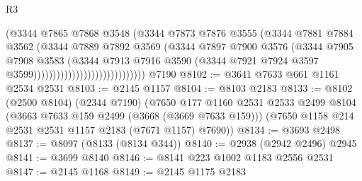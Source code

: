\begin{lexlean}{R3}
\begin{coremodule}
                                              (@3344
                                                @7865
                                                @7868
                                                @3548
                                                (@3344
                                                  @7873
                                                  @7876
                                                  @3555
                                                  (@3344
                                                    @7881
                                                    @7884
                                                    @3562
                                                    (@3344
                                                      @7889
                                                      @7892
                                                      @3569
                                                      (@3344
                                                        @7897
                                                        @7900
                                                        @3576
                                                        (@3344
                                                          @7905
                                                          @7908
                                                          @3583
                                                          (@3344
                                                            @7913
                                                            @7916
                                                            @3590
                                                            (@3344
                                                              @7921
                                                              @7924
                                                              @3597
                                                              @3599)))))))))))))))))))))))))))))
    @7190
@8102 := @3641 @7633 @661 @1161 @2534 @2531
@8103 := @2145 @1157
@8104 := @8103 @2183
@8133 := @8102
    (@2500 @8104)
    (@2344 @7190)
    (@7650
      @177
      @1160
      @2531
      @2533
      @2499
      @8104
      (@3663 @7633 @159 @2499 (@3668 (@3669 @7633 @159)))
      (@7650 @1158 @214 @2531 @2531 @1157 @2183 (@7671 @1157) @7690))
@8134 := @3693 @2498
@8137 := @8097 (@8133 (@8134 @344))
@8140 := @2938 (@2942 @2496) @2945
@8141 := @3699 @8140
@8146 := @8141 @223 @1002 @1183 @2556 @2531
@8147 := @2145 @1168
@8149 := @2145 @1175 @2183

\end{coremodule}
\end{lexlean}
